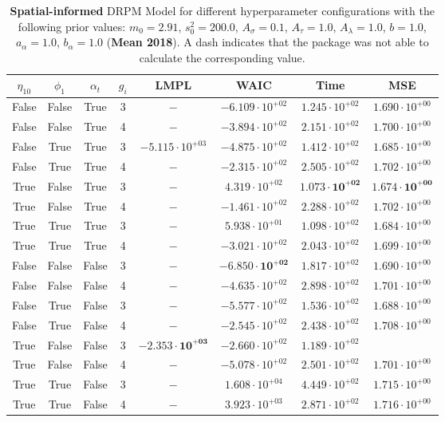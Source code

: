 \documentclass[12pt,a4paper]{article}
\begin{document}
\begin{table}
\caption{\textbf{Spatial-informed} DRPM Model for different hyperparameter configurations with the following prior values: $m_0 = 2.91$, $s_0^2 
= 200.0$, $A_\sigma = 0.1$, $A_\tau = 1.0$, $A_\lambda = 1.0$, $b = 1.0$, $a_\alpha = 1.0$, $b_\alpha = 1.0$ (\textbf{Mean 2018}).
A dash indicates that the package was not able to calculate the corresponding value.
}
\centering\begin{tabular}{cccccccc}
\toprule
$\eta_{10}$ & $\phi_1$ & $\alpha_t$ & $g_i$ & LMPL & WAIC & Time & MSE \\
\midrule
False & False & True & 3 & $-$ & $-6.109 \cdot 10^{+02}$ & $1.245 \cdot 10^{+02}$ & $1.690 \cdot 10^{+00}$ \\
False & False & True & 4 & $-$ & $-3.894 \cdot 10^{+02}$ & $2.151 \cdot 10^{+02}$ & $1.700 \cdot 10^{+00}$ \\
False & True & True & 3 & $-5.115 \cdot 10^{+03}$ & $-4.875 \cdot 10^{+02}$ & $1.412 \cdot 10^{+02}$ & $1.685 \cdot 10^{+00}$ \\
False & True & True & 4 & $-$ & $-2.315 \cdot 10^{+02}$ & $2.505 \cdot 10^{+02}$ & $1.702 \cdot 10^{+00}$ \\
True & False & True & 3 & $-$ & $4.319 \cdot 10^{+02}$ & $\mathbf{1.073 \cdot 10^{+02}}$ & $\mathbf{1.674 \cdot 10^{+00}}$ \\
True & False & True & 4 & $-$ & $-1.461 \cdot 10^{+02}$ & $2.288 \cdot 10^{+02}$ & $1.702 \cdot 10^{+00}$ \\
True & True & True & 3 & $-$ & $5.938 \cdot 10^{+01}$ & $1.098 \cdot 10^{+02}$ & $1.684 \cdot 10^{+00}$ \\
True & True & True & 4 & $-$ & $-3.021 \cdot 10^{+02}$ & $2.043 \cdot 10^{+02}$ & $1.699 \cdot 10^{+00}$ \\
False & False & False & 3 & $-$ & $\mathbf{-6.850 \cdot 10^{+02}}$ & $1.817 \cdot 10^{+02}$ & $1.690 \cdot 10^{+00}$ \\
False & False & False & 4 & $-$ & $-4.635 \cdot 10^{+02}$ & $2.898 \cdot 10^{+02}$ & $1.701 \cdot 10^{+00}$ \\
False & True & False & 3 & $-$ & $-5.577 \cdot 10^{+02}$ & $1.536 \cdot 10^{+02}$ & $1.688 \cdot 10^{+00}$ \\
False & True & False & 4 & $-$ & $-2.545 \cdot 10^{+02}$ & $2.438 \cdot 10^{+02}$ & $1.708 \cdot 10^{+00}$ \\
True & False & False & 3 & $\mathbf{-2.353 \cdot 10^{+03}}$ & $-2.660 \cdot 10^{+02}$ & $1.189 \cdot 10^{+02}$ \\
True & False & False & 4 & $-$ & $-5.078 \cdot 10^{+02}$ & $2.501 \cdot 10^{+02}$ & $1.701 \cdot 10^{+00}$ \\
True & True & False & 3 & $-$ & $1.608 \cdot 10^{+04}$ & $4.449 \cdot 10^{+02}$ & $1.715 \cdot 10^{+00}$ \\
True & True & False & 4 & $-$ & $3.923 \cdot 10^{+03}$ & $2.871 \cdot 10^{+02}$ & $1.716 \cdot 10^{+00}$ \\
\bottomrule
\end{tabular}
\end{table}
\end{document}
